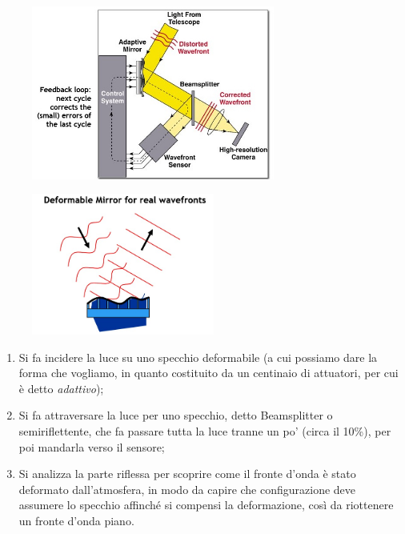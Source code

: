 \begin{minipage}{0.5\textwidth}
    \begin{figure}[H]
        \centering
        \includegraphics[width=8cm]{21.jpg}
    \end{figure}
\end{minipage}
\begin{minipage}{0.5\textwidth}
    \begin{figure}[H]
        \centering
        \includegraphics[width=6cm]{22.jpg}
    \end{figure}
\end{minipage}

\begin{enumerate}
    \item Si fa incidere la luce su uno specchio deformabile (a cui possiamo dare la forma che vogliamo, in quanto costituito da un centinaio di attuatori, per cui è detto \textit{adattivo});
    \item Si fa attraversare la luce per uno specchio, detto Beamsplitter o semiriflettente, che fa passare tutta la luce tranne un po' (circa il 10\%), per poi mandarla verso il sensore;
    \item Si analizza la parte riflessa per scoprire come il fronte d'onda è stato deformato dall'atmosfera, in modo da capire che configurazione deve assumere lo specchio affinché si compensi la deformazione, così da riottenere un fronte d'onda piano.
\end{enumerate}

